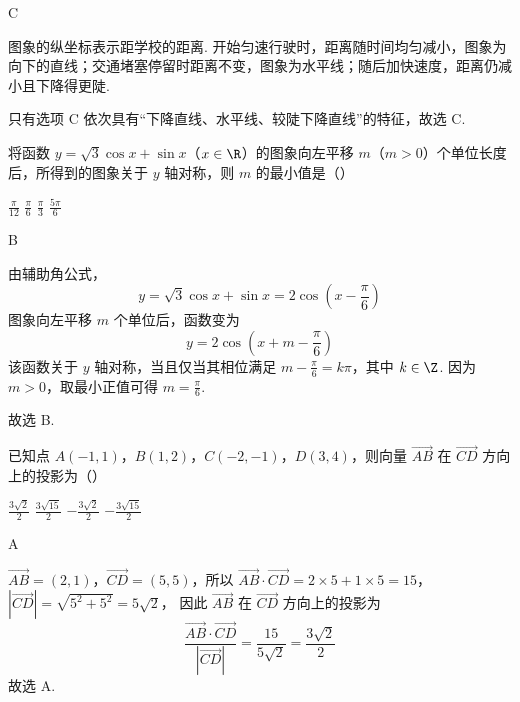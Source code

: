 \begin{answer}
C
\end{answer}

\begin{solution}
图象的纵坐标表示距学校的距离. 开始匀速行驶时，距离随时间均匀减小，图象为向下的直线；交通堵塞停留时距离不变，图象为水平线；随后加快速度，距离仍减小且下降得更陡.

只有选项 C 依次具有“下降直线、水平线、较陡下降直线”的特征，故选 C.
\end{solution}

\begin{problem}
将函数 \(y=\sqrt{3}\cos x+\sin x\)（\(x\in\R\)）的图象向左平移 \(m\)（\(m>0\)）个单位长度后，所得到的图象关于 \(y\) 轴对称，则 \(m\) 的最小值是（\quad）

\choices
    {\(\frac{\pi}{12}\)}
    {\(\frac{\pi}{6}\)}
    {\(\frac{\pi}{3}\)}
    {\(\frac{5\pi}{6}\)}
\end{problem}

\begin{answer}
B
\end{answer}

\begin{solution}
由辅助角公式，
\[
 y=\sqrt{3}\cos x+\sin x=2\cos\left(x-\frac{\pi}{6}\right)
\]
图象向左平移 \(m\) 个单位后，函数变为
\[
 y=2\cos\left(x+m-\frac{\pi}{6}\right)
\]
该函数关于 \(y\) 轴对称，当且仅当其相位满足 \(m-\frac{\pi}{6}=k\pi\)，其中 \(k\in\Z\). 因为 \(m>0\)，取最小正值可得 \(m=\frac{\pi}{6}\).

故选 B.
\end{solution}

\begin{problem}
已知点 \(A(-1,1)\)，\(B(1,2)\)，\(C(-2,-1)\)，\(D(3,4)\)，则向量 \(\overrightarrow{AB}\) 在 \(\overrightarrow{CD}\) 方向上的投影为（\quad）

\choices
    {\(\frac{3\sqrt{2}}{2}\)}
    {\(\frac{3\sqrt{15}}{2}\)}
    {\(-\frac{3\sqrt{2}}{2}\)}
    {\(-\frac{3\sqrt{15}}{2}\)}
\end{problem}

\begin{answer}
A
\end{answer}

\begin{solution}
\(\overrightarrow{AB}=(2,1)\)，\(\overrightarrow{CD}=(5,5)\)，所以
\(\overrightarrow{AB}\cdot\overrightarrow{CD}=2\times5+1\times5=15\)，\(|\overrightarrow{CD}|=\sqrt{5^2+5^2}=5\sqrt{2}\)，
因此 \(\overrightarrow{AB}\) 在 \(\overrightarrow{CD}\) 方向上的投影为
\[
 \frac{\overrightarrow{AB}\cdot\overrightarrow{CD}}{|\overrightarrow{CD}|}
 =\frac{15}{5\sqrt{2}}=\frac{3\sqrt{2}}{2}
\]
故选 A.
\end{solution}

